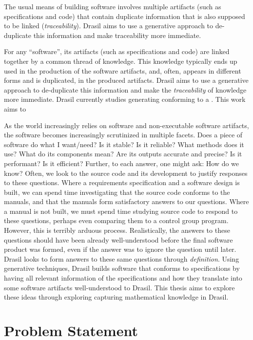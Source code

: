 The usual means of building software involves multiple artifacts (such as
specifications and code) that contain duplicate information that is also
supposed to be linked (\textit{traceability}). Drasil aims to use a generative
approach to de-duplicate this information and make traceability more immediate.

For any ``software'', its artifacts (such as specifications and code) are linked
together by a common thread of knowledge. This knowledge typically ends up used
in the production of the software artifacts, and, often, appears in different
forms and is duplicated, in the produced artifacts. Drasil\cite{Drasil2021} aims
to use a generative approach to de-duplicate this information and make the
\textit{traceability} of knowledge more immediate. Drasil currently studies
generating  conforming to a . This work aims to

As the world increasingly relies on software and non-executable software
artifacts, the software becomes increasingly scrutinized in multiple facets.
Does a piece of software do what I want/need? Is it stable? Is it reliable? What
methods does it use? What do its components mean? Are its outputs accurate and
precise? Is it performant? Is it efficient? Further, to each answer, one might
ask: How do we know? Often, we look to the source code and its development to
justify responses to these questions. Where a requirements specification and a
software design is built, we can spend time investigating that the source code
conforms to the manuals, and that the manuals form satisfactory answers to our
questions. Where a manual is not built, we must spend time studying source code
to respond to these questions, perhaps even comparing them to a control group
program. However, this is terribly arduous process. Realistically, the answers
to these questions should have been already well-understood before the final
software product was formed, even if the answer was to ignore the question until
later. Drasil \cite{Drasil2021} looks to form answers to these same questions
through \textit{definition}. Using generative techniques, Drasil builds software
that conforms to specifications by having all relevant information of the
specifications and how they translate into some software artifacts
well-understood to Drasil. This thesis aims to explore these ideas through
exploring capturing mathematical knowledge in Drasil.

\section{Problem Statement}
\label{sec:intro:problemStatement}

